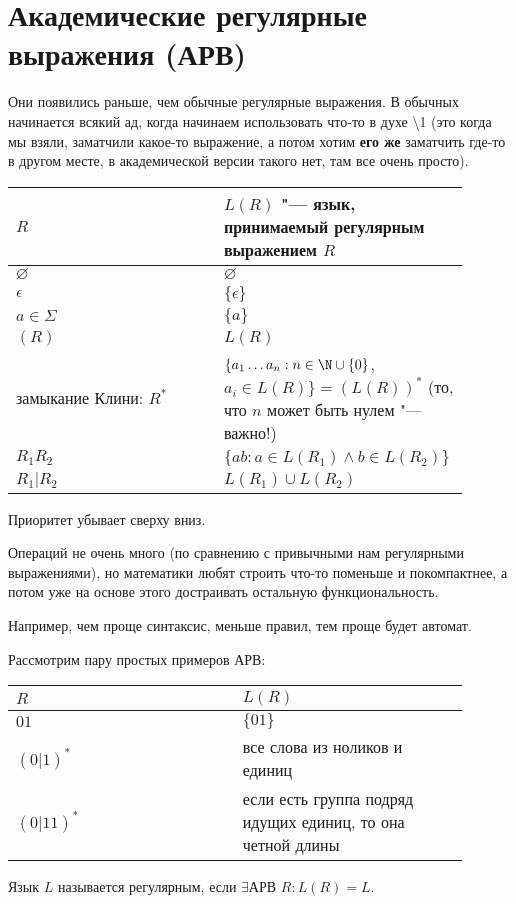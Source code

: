 \section{Академические регулярные выражения (АРВ)}
Они появились раньше, чем обычные регулярные выражения. В обычных начинается всякий ад, когда начинаем использовать что-то в духе \textbackslash1
(это когда мы взяли, заматчили какое-то выражение, а потом хотим \textbf{его же} заматчить где-то в другом месте, в академической версии такого нет, там все очень просто).

\begin{tabular}{p{0.45\linewidth}|p{0.45\linewidth}}
$R$ & $L(R)$ "--- язык, принимаемый регулярным выражением $R$ \\
\hline
$\varnothing$ & $\varnothing$ \\
$\epsilon$ & $\{\epsilon\}$ \\
$a \in \Sigma$ & $\{a\}$ \\
$(R)$ & $L(R)$ \\
замыкание Клини: $R^*$ & $\{a_1 \dots a_n: n \in \N \cup \{0\}$, $a_i \in L(R)\} = (L(R))^*$ (то, что $n$ может быть нулем "--- важно!) \\
$R_1R_2$ & $\{ab: a \in L(R_1) \land b \in L(R_2)\}$ \\
$R_1 | R_2$ & $L(R_1) \cup L(R_2)$
\end{tabular}

Приоритет убывает сверху вниз.

\begin{Rem}
Операций не очень много (по сравнению с привычными нам регулярными выражениями), но математики любят строить что-то поменьше и покомпактнее, а потом уже на основе этого достраивать остальную функциональность.

Например, чем проще синтаксис, меньше правил, тем проще будет автомат.
\end{Rem}

\begin{exmp}
Рассмотрим пару простых примеров АРВ:

\begin{tabular}{p{0.45\linewidth} | p{0.45\linewidth}}
$R$ & $L(R)$ \\
\hline
$01$ & $\{01\}$ \\
$(0|1)^*$ & все слова из ноликов и единиц \\
$(0|11)^*$ & если есть группа подряд идущих единиц, то она четной длины
\end{tabular}
\end{exmp}

\begin{Def}
Язык $L$ называется регулярным, если $\exists \text{АРВ } R: L(R) = L$.
\end{Def}